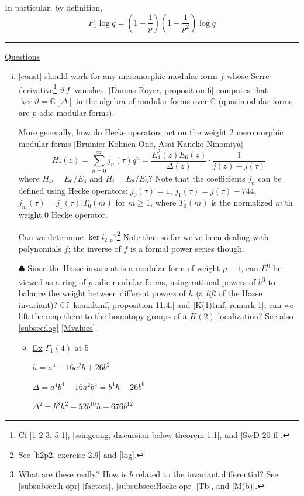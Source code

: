 \documentclass{rs}
\theoremstyle{definition}
\theoremstyle{remark}
\newcommand{\mb}[1]{\mathbb{#1}}
\newcommand{\BC}{{\mb C}}
\renewcommand{\D}{\Delta}
\newcommand{\G}{\Gamma}
\newcommand{\todo}{\spadesuit}
\renewcommand{\=}{\approx}
\renewcommand{\-}{\sim}
\numberwithin{equation}{section}
\numberwithin{thm}{section}
\begin{document}
In particular, by definition, 
\[
 F_1 \log q = (1 - \frac{1}{p}) (1 - \frac{1}{p^2}) \log q 
\]

\hrule

\underline{Questions}
\begin{enumerate}[(i)]
 \item \label{padicmf} \eqref{const} should work for any meromorphic modular form $f$ whose Serre 
 derivative\footnote{Cf [1-2-3, 5.1], [ssingcong, discussion below 
 theorem 1.1], and [SwD-20 ff].  } $\vartheta \thinspace f$ vanishes.  
 [Dumas-Royer, proposition 6] computes that $\ker \vartheta = \BC[\D]$ in the algebra of modular forms over $\BC$ 
 (quasimodular forms are $p$-adic modular forms).  

 More generally, how do Hecke operators act on the weight 2 meromorphic modular forms [Bruinier-Kohnen-Ono, Asai-Kaneko-Ninomiya] 
 \[
  H_\tau(z) = \sum_{n=0}^\infty j_n(\tau) q^n = \frac{E_4^2(z) E_6(z)}{\D(z)} \cdot \frac{1}{j(z) - j(\tau)} 
 \]
 where $H_\omega = E_6 / E_4$ and $H_i = E_8 / E_6$?  
 Note that the coefficients $j_n$ can be defined using Hecke operators: 
 $j_0(\tau) = 1$, $j_1(\tau) = j(\tau) - 744$, 
 $j_m(\tau) = j_1(\tau) | T_0(m)$ for $m \geq 1$, 
 where $T_0(m)$ is the normalized $m$'th weight 0 Hecke operator.  

 Can we determine $\ker l_{2,p}$?\footnote{See [h2p2, 
 exercise 2.9] and \eqref{log}.  }  Note that so far we've been dealing with 
 polynomials $f$; the inverse of $f$ is a formal power series though.  

 $\todo$ Since the Hasse invariant is a modular form of weight $p - 1$, can 
 $E^0$ be viewed as a ring of $p$-adic modular forms, using rational powers of 
 $b$\footnote{What are these really?  How is $b$ related to the invariant differential?  
 See \ref{subsubsec:h-opr} \eqref{factors}, \ref{subsubsec:Hecke-opr} \eqref{Tb}, and \eqref{M(b)}.  } to balance the weight between 
 different powers of $h$ (a {\em lift} of the Hasse invariant)?  Cf [koandtmf, 
 proposition 11.4i] and [K(1)tmf, remark 1]; can we lift the map there to the homotopy groups of a $K(2)$-localization?  
 See also \ref{subsec:log} \eqref{Mvalues}.  
 \begin{itemize}
  \item \underline{Ex} \quad
  $\G_1(4)$ at 5 

  $h = a^4 - 16 a^2 b + 26 b^2$ 

  $\D = a^4 b^4 - 16 a^2 b^5 = b^4 h - 26 b^6$ 

  $\D^2 = b^8 h^2 - 52 b^{10} h + 676 b^{12}$ 


\end{itemize}
\end{enumerate}
\end{document}
